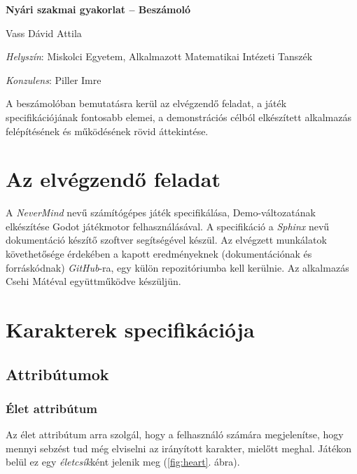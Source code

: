 \documentclass[a4paper]{article}
\begin{document}


\begin{center}
    \Large \textbf{Nyári szakmai gyakorlat -- Beszámoló}
    
	\bigskip
	
	\Large Vass Dávid Attila
\end{center}

\medskip

\textit{Helyszín}: Miskolci Egyetem, Alkalmazott Matematikai Intézeti Tanszék

\textit{Konzulens}: Piller Imre

\bigskip

A beszámolóban bemutatásra kerül az elvégzendő feladat, a játék specifikációjának fontosabb elemei, a demonstrációs célból elkészített alkalmazás felépítésének és működésének rövid áttekintése.

\tableofcontents

\section{Az elvégzendő feladat}

A \textit{NeverMind} nevű számítógépes játék specifikálása, Demo-változatának elkészítése Godot játékmotor felhasználásával. A specifikáció a \textit{Sphinx} nevű dokumentáció készítő szoftver segítségével készül. Az elvégzett munkálatok követhetősége érdekében a kapott eredményeknek (dokumentációnak és forráskódnak) \textit{GitHub}-ra, egy külön repozitóriumba kell kerülnie. Az alkalmazás Csehi Mátéval együttműködve készüljün.

\section{Karakterek specifikációja}

\subsection{Attribútumok}

\subsubsection{Élet attribútum}

Az élet attribútum arra szolgál, hogy a felhasználó számára megjelenítse, hogy mennyi sebzést tud még elviselni az irányított karakter, mielőtt meghal.
Játékon belül ez egy \textit{életcsík}ként jelenik meg (\ref{fig:heart}. ábra).
\end{document}
